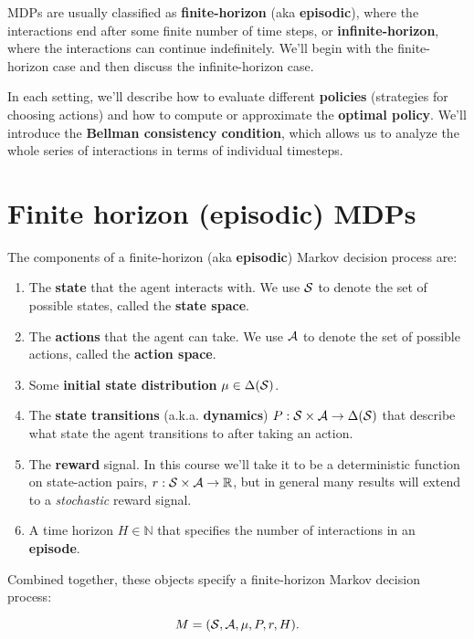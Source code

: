 \documentclass[../main/main]{subfiles}
\begin{document}
MDPs are usually classified as \textbf{finite-horizon} (aka \textbf{episodic}), where the interactions end after some finite number of time steps, or \textbf{infinite-horizon}, where the interactions can continue indefinitely. We'll begin with the finite-horizon case and then discuss the infinite-horizon case.

In each setting, we'll describe how to evaluate different \textbf{policies} (strategies for choosing actions) and how to compute or approximate the \textbf{optimal policy}. We'll introduce the \textbf{Bellman consistency condition}, which allows us to analyze the whole series of interactions in terms of individual timesteps.

\section{Finite horizon (episodic) MDPs}

The components of a finite-horizon (aka \textbf{episodic}) Markov decision process are:

\begin{enumerate}
    \item The \textbf{state} that the agent interacts with. We use $\S$ to denote the set of possible states, called the \textbf{state space}.
    \item The \textbf{actions} that the agent can take. We use $\A$ to denote the set of possible actions, called the \textbf{action space}.
    \item Some \textbf{initial state distribution} $\mu \in \Delta(\S)$.
    \item The \textbf{state transitions} (a.k.a. \textbf{dynamics}) $P : \S \times \A \to \Delta(\S)$ that describe what state the agent transitions to after taking an action.
    \item The \textbf{reward} signal. In this course we'll take it to be a deterministic function on state-action pairs, $r : \S \times \A \to \mathbb{R}$, but in general many results will extend to a \emph{stochastic} reward signal.
    \item A time horizon $H \in \mathbb{N}$ that specifies the number of interactions in an \textbf{episode}.
\end{enumerate}

Combined together, these objects specify a finite-horizon Markov decision process:

\[
    M = (\S, \A, \mu, P, r, H).
\]
\end{document}
